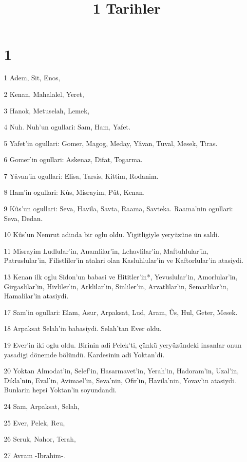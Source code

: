

\title{1 Tarihler}


\chapter{1}

\par 1 Adem, Sit, Enos,
\par 2 Kenan, Mahalalel, Yeret,
\par 3 Hanok, Metuselah, Lemek,
\par 4 Nuh. Nuh'un ogullari: Sam, Ham, Yafet.
\par 5 Yafet'in ogullari: Gomer, Magog, Meday, Yâvan, Tuval, Mesek, Tiras.
\par 6 Gomer'in ogullari: Askenaz, Difat, Togarma.
\par 7 Yâvan'in ogullari: Elisa, Tarsis, Kittim, Rodanim.
\par 8 Ham'in ogullari: Kûs, Misrayim, Pût, Kenan.
\par 9 Kûs'un ogullari: Seva, Havila, Savta, Raama, Savteka. Raama'nin ogullari: Seva, Dedan.
\par 10 Kûs'un Nemrut adinda bir oglu oldu. Yigitligiyle yeryüzüne ün saldi.
\par 11 Misrayim Ludlular'in, Anamlilar'in, Lehavlilar'in, Maftuhlular'in, Patruslular'in, Filistliler'in atalari olan Kasluhlular'in ve Kaftorlular'in atasiydi.
\par 13 Kenan ilk oglu Sidon'un babasi ve Hititler'in*, Yevuslular'in, Amorlular'in, Girgaslilar'in, Hivliler'in, Arklilar'in, Sinliler'in, Arvatlilar'in, Semarlilar'in, Hamalilar'in atasiydi.
\par 17 Sam'in ogullari: Elam, Asur, Arpaksat, Lud, Aram, Ûs, Hul, Geter, Mesek.
\par 18 Arpaksat Selah'in babasiydi. Selah'tan Ever oldu.
\par 19 Ever'in iki oglu oldu. Birinin adi Pelek'ti, çünkü yeryüzündeki insanlar onun yasadigi dönemde bölündü. Kardesinin adi Yoktan'di.
\par 20 Yoktan Almodat'in, Selef'in, Hasarmavet'in, Yerah'in, Hadoram'in, Uzal'in, Dikla'nin, Eval'in, Avimael'in, Seva'nin, Ofir'in, Havila'nin, Yovav'in atasiydi. Bunlarin hepsi Yoktan'in soyundandi.
\par 24 Sam, Arpaksat, Selah,
\par 25 Ever, Pelek, Reu,
\par 26 Seruk, Nahor, Terah,
\par 27 Avram -Ibrahim-.
